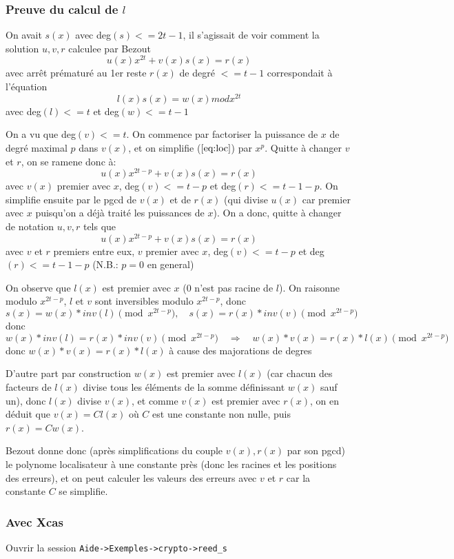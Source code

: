 \documentclass[a4paper,11pt]{article}
\begin{document}
\begin{giacjshere}
\subsubsection{Preuve du calcul de $l$}
On avait $s(x)$ avec deg$(s)<=2t-1$,
il s'agissait de voir comment la solution $u,v,r$ calculee par Bezout
\begin{equation}   \label{eq:loc}
 u(x)  x^{2t}+ v(x) s(x) = r(x) 
\end{equation}
avec arr\^et pr\'ematur\'e au 1er reste $r(x)$ de degr\'e $<=t-1$ 
correspondait \`a l'\'equation
\[   l(x) s(x) = w(x) mod x^{2t} \]
avec deg$(l)<=t$ et deg$(w)<=t-1$

On a vu que deg$(v)<=t$.
On commence par factoriser la puissance de $x$ de degr\'e maximal $p$ dans
$v(x)$, et on simplifie (\(\ref{eq:loc}\)) par $x^p$. 
Quitte \`a changer $v$ et $r$, on se
ramene donc \`a:
\[   u(x)  x^{2t-p}+ v(x) s(x) = r(x) \]
avec $v(x)$ premier avec $x$, deg$(v)<= t-p$ et deg$(r)<= t-1-p$.
On simplifie ensuite par le pgcd de $v(x)$ et de $r(x)$
(qui divise $u(x)$ car premier avec $x$ puisqu'on a d\'ej\`a trait\'e les
puissances de $x$).
On a donc, quitte \`a changer de notation $u,v,r$ tels que
\[  u(x)  x^{2t-p}+ v(x) s(x) = r(x) \]
avec $v$ et $r$ premiers entre eux, $v$ premier avec $x$,
deg$(v)<=t-p$ et deg$(r)<=t-1-p$ (N.B.: $p=0$ en general)

On observe que $l(x)$ est premier avec $x$ ($0$ n'est pas racine de $l$).
On raisonne modulo $x^{2t-p}$, $l$ et $v$ sont inversibles modulo $x^{2t-p}$,
donc 
\[ s(x) = w(x)*inv(l) \pmod{ x^{2t-p}},
\quad s(x) = r(x)*inv(v) \pmod {x^{2t-p}} \]
donc 
\[ w(x)*inv(l)=r(x)*inv(v) \pmod{x^{2t-p}} 
\quad \Rightarrow \quad w(x)*v(x)=r(x)*l(x) \pmod {x^{2t-p}} \]
donc $w(x)*v(x)=r(x)*l(x)$ \`a cause des majorations de degres

D'autre part par construction $w(x)$ est premier avec $l(x)$ (car chacun
des facteurs de $l(x)$ divise tous les \'el\'ements de la somme d\'efinissant
$w(x)$ sauf un), donc $l(x)$ divise $v(x)$, et comme $v(x)$ est premier
avec $r(x)$, on en d\'eduit que $v(x)=C l(x)$ o\`u $C$ est une constante non
nulle, puis $r(x) = C w(x)$.

Bezout donne donc (apr\`es simplifications du couple $v(x), r(x)$ par
son pgcd) le polynome localisateur \`a une constante pr\`es (donc les
racines et les positions des erreurs), et on peut calculer
les valeurs des erreurs avec $v$ et $r$ car la constante $C$ se simplifie.

\subsubsection{Avec Xcas}
Ouvrir la session \verb|Aide->Exemples->crypto->reed_s|



\end{giacjshere}
\end{document}
